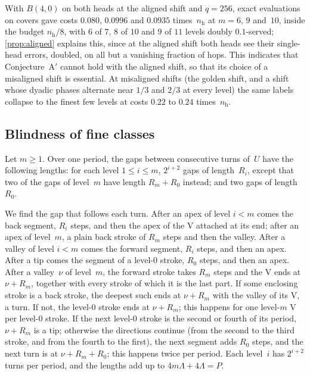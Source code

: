 \begin{remark}\label{rem:aligned}
With $B(4,0)$ on both heads at the aligned shift and $q=256$, exact evaluations on covers gave costs $0.080$, $0.0996$ and
$0.0935$ times~$n_{\mathrm h}$ at $m=6$, $9$ and~$10$, inside the budget $n_{\mathrm h}/8$, with $6$ of $7$, $8$ of $10$ and $9$
of $11$ levels doubly $0.1$-served; \cref{prop:aligned} explains this, since at the aligned shift both heads see their
single-head errors, doubled, on all but a vanishing fraction of hops. This indicates that Conjecture~A$'$ cannot hold with the
aligned shift, so that its choice of a misaligned shift is essential. At misaligned shifts
(the golden shift, and a shift whose dyadic phases alternate near $1/3$ and $2/3$ at every level) the same labels
collapse to the finest few levels at costs $0.22$ to $0.24$ times~$n_{\mathrm h}$.
\end{remark}

\subsection{Blindness of fine classes}\label{sec:dnp-blind}

\begin{lemma}\label{lem:runs}
\notformalized
Let $m\ge1$. Over one period, the gaps between consecutive turns of~$U$ have the following lengths: for each level $1\le i\le m$,
$2^{i+2}$ gaps of length~$R_i$, except that two of the gaps of level~$m$ have length $R_m+R_0$ instead; and two gaps of
length~$R_0$.
\end{lemma}

\begin{informalproof}
We find the gap that follows each turn. After an apex of level $i<m$ comes the back segment, $R_i$ steps, and then the apex
of the V attached at its end; after an apex of level~$m$, a plain back stroke of $R_m$ steps and then the valley. After a
valley of level $i<m$ comes the forward segment, $R_i$ steps, and then an apex. After a tip comes the segment of a level-$0$
stroke, $R_0$ steps, and then an apex. After a valley~$\nu$ of level~$m$, the forward stroke takes $R_m$ steps and the V
ends at $\nu+R_m$, together with every stroke of which it is the last part. If some enclosing stroke is a back stroke, the
deepest such ends at $\nu+R_m$ with the valley of its V, a turn. If not, the level-$0$ stroke ends at $\nu+R_m$; this happens
for one level-$m$ V per level-$0$ stroke. If the next level-$0$ stroke is the second or fourth of its period, $\nu+R_m$ is a
tip; otherwise the directions continue (from the second to the third stroke, and from the fourth to the first), the next
segment adds $R_0$ steps, and the next turn is at $\nu+R_m+R_0$; this happens twice per period. Each level~$i$ has
$2^{i+2}$ turns per period, and the lengths add up to $4m\Lambda+4\Lambda=P$.
\end{informalproof}

